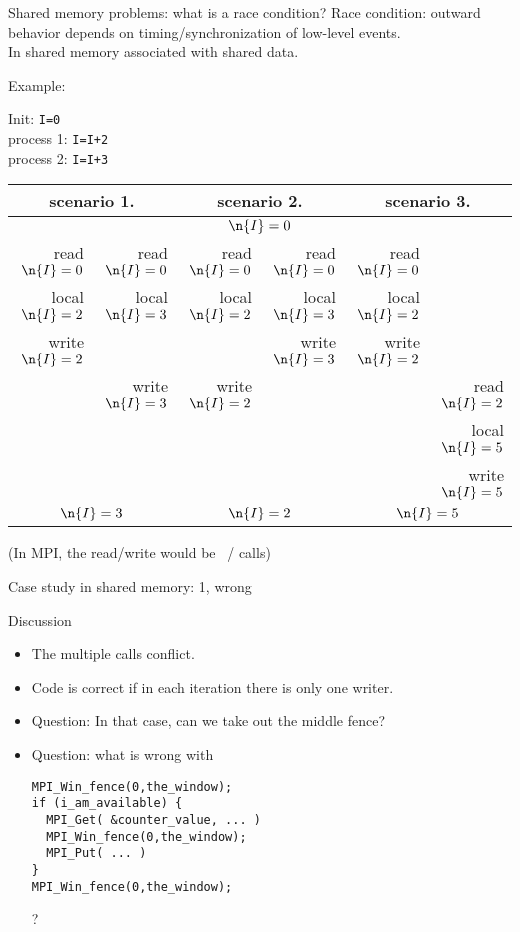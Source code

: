 \begin{numberedframe}{Shared memory problems: what is a race condition?}
  \scriptsize
  Race condition: outward behavior depends on
  timing/synchronization of low-level events.\\
  In shared memory associated with shared data.

  Example:
  \begin{tabbing}
    Init: \texttt{I=0}\\
    process 1: \texttt{I=I+2}\\
    process 2: \texttt{I=I+3}
  \end{tabbing}
  \begin{tabular}{|rr|rr|rr|}
    \hline
    \multicolumn{2}{|c|}{scenario 1.}& \multicolumn{2}{|c|}{scenario 2.}&
    \multicolumn{2}{|c|}{scenario 3.}\\ \hline
    \multicolumn{6}{|c|}{$\n{I}=0$}\\ \hline
    read $\n{I}=0$&read $\n{I}=0$&
    read $\n{I}=0$&read $\n{I}=0$&
    read $\n{I}=0$& \\
    local $\n{I}=2$&local $\n{I}=3$& 
    local $\n{I}=2$&local $\n{I}=3$&
    local $\n{I}=2$& \\
    write $\n{I}=2$& & &write $\n{I}=3$&write $\n{I}=2$& \\
    &write $\n{I}=3$&write $\n{I}=2$& & &read $\n{I}=2$\\
    &&&&&local $\n{I}=5$\\
    &&&&&write $\n{I}=5$\\
    \hline
    \multicolumn{2}{|c|}{$\n{I}=3$}& \multicolumn{2}{|c|}{$\n{I}=2$}&
    \multicolumn{2}{|c|}{$\n{I}=5$}\\ \hline
  \end{tabular}

  (In MPI, the read/write would be ~/  calls)
\end{numberedframe}

\begin{numberedframe}{Case study in shared memory: 1, wrong}
  \label{sl:fetchput}
\end{numberedframe}

\begin{numberedframe}{Discussion}
  \begin{itemize}
  \item The multiple  calls conflict.
  \item Code is correct if in each iteration there is only one writer.
  \item Question: In that case, can we take out the middle fence?
  \item Question: what is wrong with
\begin{lstlisting}
MPI_Win_fence(0,the_window);
if (i_am_available) {
  MPI_Get( &counter_value, ... )
  MPI_Win_fence(0,the_window);
  MPI_Put( ... )      
}
MPI_Win_fence(0,the_window);
\end{lstlisting}
?
  \end{itemize}
\end{numberedframe}

